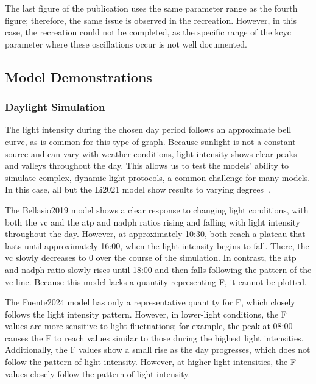 The last figure of the publication uses the same parameter range as the fourth figure; therefore, the same issue is observed in the recreation. However, in this case, the recreation could not be completed, as the specific range of the \gls{kcyc} parameter where these oscillations occur is not well documented.

\subsection{Model Demonstrations}

\subsubsection{Daylight Simulation}

The light intensity during the chosen day period follows an approximate bell curve, as is common for this type of graph. Because sunlight is not a constant source and can vary with weather conditions, light intensity shows clear peaks and valleys throughout the day. This allows us to test the models' ability to simulate complex, dynamic light protocols, a common challenge for many models. In this case, all but the Li2021 model show results to varying degrees~.

The Bellasio2019 model shows a clear response to changing light conditions, with both the \gls{vc} and the \gls{atp} and \gls{nadph} ratios rising and falling with light intensity throughout the day. However, at approximately 10:30, both reach a plateau that lasts until approximately 16:00, when the light intensity begins to fall. There, the \gls{vc} slowly decreases to 0 over the course of the simulation. In contrast, the \gls{atp} and \gls{nadph} ratio slowly rises until 18:00 and then falls following the pattern of the \gls{vc} line. Because this model lacks a quantity representing \gls{F}, it cannot be plotted.

The Fuente2024 model has only a representative quantity for \gls{F}, which closely follows the light intensity pattern. However, in lower-light conditions, the \gls{F} values are more sensitive to light fluctuations; for example, the peak at 08:00 causes the \gls{F} to reach values similar to those during the highest light intensities. Additionally, the \gls{F} values show a small rise as the day progresses, which does not follow the pattern of light intensity. However, at higher light intensities, the \gls{F} values closely follow the pattern of light intensity.

